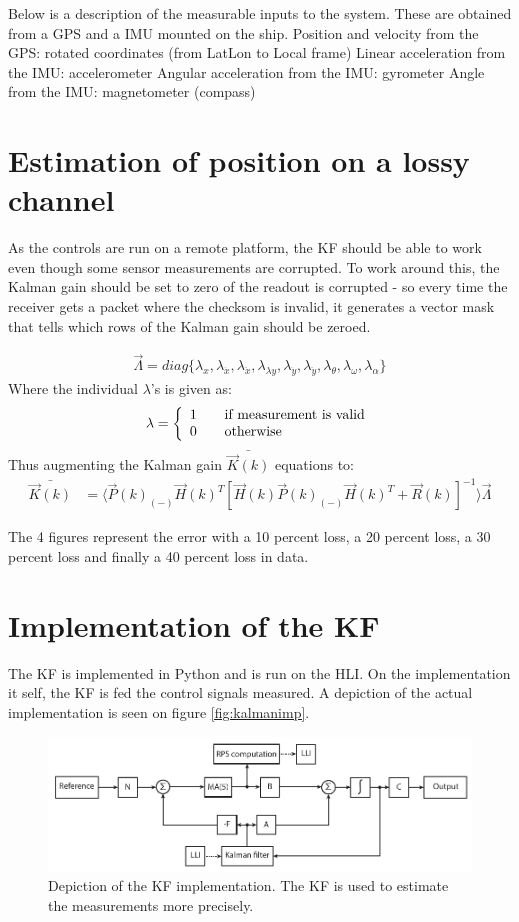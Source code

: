 Below is a description of the measurable inputs to the system. These are obtained from a \ac{GPS} and a \ac{IMU} mounted on the ship.
Position and velocity from the \ac{GPS}: rotated coordinates (from LatLon to Local frame)
Linear acceleration from the \ac{IMU}: accelerometer
Angular acceleration from the \ac{IMU}: gyrometer
Angle from the \ac{IMU}: magnetometer (compass)

\section{Estimation of position on a lossy channel}
As the controls are run on a remote platform, the \ac{KF} should be able to work even though some sensor measurements are corrupted. To work around this, the Kalman gain should be set to zero of the readout is corrupted - so every time the receiver gets a packet where the checksom is invalid, it generates a vector mask that tells which rows of the Kalman gain should be zeroed. 

\begin{align}
\vec{\Lambda} = diag\{\lambda_x,\lambda_{\dot{x}},\lambda_{\ddot{x}},\lambda_{\lambda{y}},\lambda_{\dot{y}},\lambda_{\ddot{y}},\lambda_{\theta},\lambda_{\omega},\lambda_{\alpha} \}
\end{align}
\noindent Where the individual $\lambda$'s is given as: 
\begin{align}
\lambda = 
\left\{ 
  \begin{array}{l l}
    1 & \quad \text{if measurement is valid}\\
    0 & \quad \text{otherwise}
  \end{array} \right.
\end{align} 
Thus augmenting the Kalman gain $\bar{\vec{K}(k)}$ equations to:
\begin{align}
\bar{\vec{K}(k)} &= \langle\vec{P}(k)_{(-)} \vec{H}(k)^T [\vec{H}(k)\vec{P}(k)_{(-)} \vec{H}(k)^T + \vec{R}(k)]^{-1}\rangle\vec{\Lambda} 
\end{align} 

The 4 figures represent the error with a 10 percent loss, a 20 percent loss, a 30 percent loss and finally a 40 percent loss in data. 

\section{Implementation of the \ac{KF}}
The \ac{KF} is implemented in Python and is run on the \ac{HLI}. On the implementation it self, the \ac{KF} is fed the control signals measured. A depiction of the actual implementation is seen on figure \vref{fig:kalmanimp}.

\begin{figure}[htbp]
	\centering
	\includegraphics[width=\textwidth]{img/kalmanim}
	\caption{Depiction of the \ac{KF} implementation. The \ac{KF} is used to estimate the measurements more precisely.}
	\label{fig:kalmanimp}
\end{figure}
